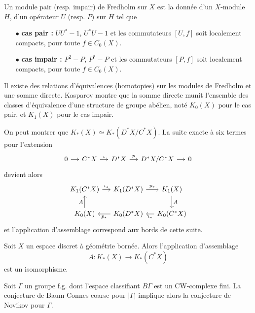 \documentclass{beamer}
\begin{document}
\begin{frame}
\begin{definition}
Un module pair (resp. impair) de Fredholm sur $X$ est la donnée d'un $X$-module $H$, d'un opérateur $U$ (resp. $P$) sur $H$ tel que
\begin{itemize}
\item[$\bullet$] \textbf{cas pair :} $UU^*-1$, $U^*U-1$ et les commutateurs $[U,f]$ soit localement compacts, pour toute $f\in C_0(X)$.
\item[$\bullet$] \textbf{cas impair :} $P^2-P$, $P^*-P$ et les commutateurs $[P,f]$ soit localement compacts, pour toute $f\in C_0(X)$.
\end{itemize}
Il existe des relations d'équivalences (homotopies) sur les modules de Fredholm et une somme directe. Kasparov montre que la somme directe munit l'ensemble des classes d'équivalence d'une structure de groupe abélien, noté $K_0(X)$ pour le cas pair, et $K_1(X)$ pour le cas impair. 
\end{definition}
\end{frame}

\begin{frame}
On peut montrer que $K_*(X)\simeq K_*(D^*X/C^*X)$. La suite exacte à six termes pour l'extension 
\[\begin{tikzcd}[ampersand replacement=\&,column sep = small]
0 \arrow{r} \& C^*X \arrow{r}{\iota} \& D^*X\arrow{r}{p} \& D^*X/C^*X\arrow{r} \& 0  
\end{tikzcd}\]
devient alors
\[\begin{tikzcd}[ampersand replacement=\&,column sep = small]
 K_1(C^*X)\arrow{r}{\iota_*}\& K_1(D^*X)\arrow{r}{p_*}\& K_1(X)\arrow{d}{A}\\
K_0(X)\arrow{u}{A}\& K_0(D^*X)\arrow{l}{p_*}\& K_0(C^*X)\arrow{l}{\iota_*}
\end{tikzcd}\]
et l'application d'assemblage correspond aux bords de cette suite.
\end{frame}

\begin{frame}
\begin{conj} Soit $X$ un espace discret à géométrie bornée. Alors l'application d'assemblage 
\[A : K_*(X)\rightarrow K_*(C^*X)\]
est un isomorphisme.
\end{conj}
\begin{thm} Soit $\Gamma$ un groupe f.g. dont l'espace classifiant $B\Gamma$ est un CW-complexe fini. La conjecture de Baum-Connes coarse pour $|\Gamma|$ implique alors la conjecture de Novikov pour $\Gamma$. 
\end{thm}
\end{frame}
\end{document}
